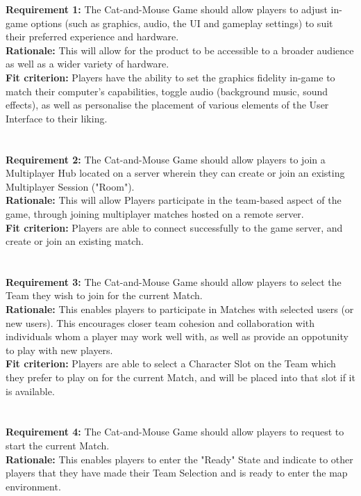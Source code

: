 \documentclass[12pt, titlepage]{article}
\begin{document}
\textbf{Requirement 1:}  The Cat-and-Mouse Game should allow players to adjust in-game options (such as graphics, audio, the UI and gameplay settings) to suit their preferred experience and hardware.
\\
\textbf{Rationale:}  This will allow for the product to be accessible to a broader audience as well as a wider variety of hardware.
\\
\textbf{Fit criterion:}  Players have the ability to set the graphics fidelity in-game to match their computer's capabilities, toggle audio (background music, sound effects), as well as personalise the placement of various elements of the User Interface to their liking.
\\
\\
\\ \textbf{Requirement 2:}  The Cat-and-Mouse Game should allow players to join a Multiplayer Hub located on a server wherein they can create or join an existing Multiplayer Session ("Room").
\\
\textbf{Rationale:}  This will allow Players participate in the team-based aspect of the game, through joining multiplayer matches hosted on a remote server. 
\\
\textbf{Fit criterion:}  Players are able to connect successfully to the game server,  and create or join an existing match.
\\
\\
\\ \textbf{Requirement 3:}  The Cat-and-Mouse Game should allow players to select the Team they wish to join for the current Match.\\
\textbf{Rationale:}  This enables players to participate in Matches with selected users (or new users). This encourages closer team cohesion and collaboration with individuals whom a player may work well with, as well as provide an oppotunity to play with new players.
\\
\textbf{Fit criterion:}  Players are able to select a Character Slot on the Team which they prefer to play on for the current Match, and will be placed into that slot if it is available.
\\
\\
\\ \textbf{Requirement 4:}  The Cat-and-Mouse Game should allow players to request to start the current Match.\\
\textbf{Rationale:}  This enables players to enter the "Ready" State and indicate to other players that they have made their Team Selection and is ready to enter the map environment. \\
\end{document}
